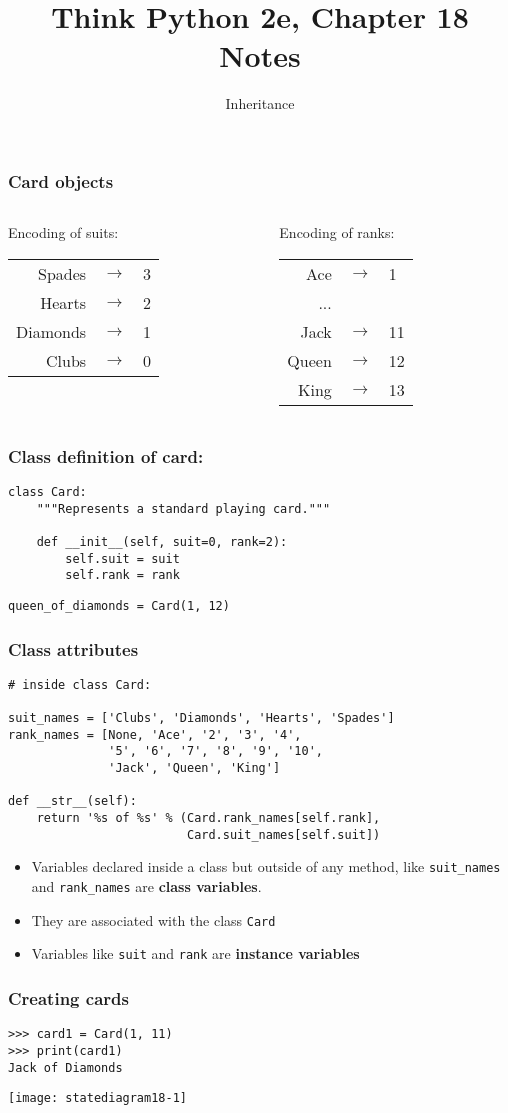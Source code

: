 \documentclass{beamer}
\title{Think Python 2e, Chapter 18 Notes}
\author{Inheritance}
\newcommand{\bi}{\begin{itemize}}
\newcommand{\li}{\item}
\newcommand{\ei}{\end{itemize}}
\newcommand{\bfr}[1]{\begin{frame}[fragile]\frametitle{{ #1 }}}
\newcommand{\cola}{\begin{columns}\begin{column}{0.5\textwidth}}
\newcommand{\colb}{\end{column}\begin{column}{0.5\textwidth}}
\newcommand{\colc}{\end{column}\end{columns}}
\begin{document}
\begin{frame}
\maketitle
\end{frame}

\bfr{Card objects}

\cola
Encoding of suits:\\

\begin{tabular}{rcl}
Spades & $\rightarrow$ & 3\\
Hearts & $\rightarrow$ & 2\\
Diamonds & $\rightarrow$ & 1\\
Clubs & $\rightarrow$ & 0\\
\end{tabular}
\colb
Encoding of ranks:\\

\begin{tabular}{rcl}
Ace & $\rightarrow$ & 1\\
...\\
Jack & $\rightarrow$ & 11\\
Queen & $\rightarrow$ & 12\\
King & $\rightarrow$ & 13\\
\end{tabular}
\colc

\end{frame}

\bfr{Class definition of card:}
\begin{lstlisting}
class Card:
    """Represents a standard playing card."""

    def __init__(self, suit=0, rank=2):
        self.suit = suit
        self.rank = rank
\end{lstlisting}
\begin{lstlisting}
queen_of_diamonds = Card(1, 12)
\end{lstlisting}

\end{frame}

\bfr{Class attributes}
\begin{lstlisting}
# inside class Card:

suit_names = ['Clubs', 'Diamonds', 'Hearts', 'Spades']
rank_names = [None, 'Ace', '2', '3', '4', 
              '5', '6', '7', '8', '9', '10',
              'Jack', 'Queen', 'King']

def __str__(self):
    return '%s of %s' % (Card.rank_names[self.rank],
                         Card.suit_names[self.suit])

\end{lstlisting}
\bi
\li Variables declared inside a class but outside of any
method, like \lstinline{suit_names} and \lstinline{rank_names}
 are {\bf class variables}.
\li They are associated with the class \lstinline{Card}
\li Variables like \lstinline{suit} and \lstinline{rank} are 
{\bf instance variables}
\ei

\end{frame}
\bfr{Creating cards}
\begin{lstlisting}
>>> card1 = Card(1, 11)
>>> print(card1)
Jack of Diamonds
\end{lstlisting}

\texttt{[image: statediagram18-1]}

\end{frame}
\end{document}
